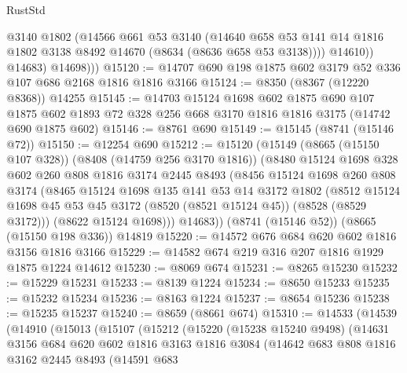 \begin{lexlean}{RustStd}
\begin{coremodule}
                @3140
                @1802
                (@14566
                  @661
                  @53
                  @3140
                  (@14640
                    @658
                    @53
                    @141
                    @14
                    @1816
                    @1802
                    @3138
                    @8492
                    @14670
                    (@8634 (@8636 @658 @53 @3138))))
                @14610))
            @14683)
          @14698)))
@15120 := @14707 @690 @198 @1875 @602 @3179 @52 @336 @107 @686 @2168 @1816 @1816 @3166
@15124 := @8350 (@8367 (@12220 @8368)) @14255
@15145 := @14703
    @15124
    @1698
    @602
    @1875
    @690
    @107
    @1875
    @602
    @1893
    @72
    @328
    @256
    @668
    @3170
    @1816
    @1816
    @3175
    (@14742 @690 @1875 @602)
@15146 := @8761 @690
@15149 := @15145 (@8741 (@15146 @72))
@15150 := @12254 @690
@15212 := @15120
    (@15149
      (@8665 (@15150 @107 @328))
      (@8408 (@14759 @256 @3170 @1816))
      (@8480
        @15124
        @1698
        @328
        @602
        @260
        @808
        @1816
        @3174
        @2445
        @8493
        (@8456
          @15124
          @1698
          @260
          @808
          @3174
          (@8465
            @15124
            @1698
            @135
            @141
            @53
            @14
            @3172
            @1802
            (@8512 @15124 @1698 @45 @53 @45 @3172 (@8520 (@8521 @15124 @45)) (@8528 (@8529 @3172)))
            (@8622 @15124 @1698)))
        @14683))
    (@8741 (@15146 @52))
    (@8665 (@15150 @198 @336))
    @14819
@15220 := @14572 @676 @684 @620 @602 @1816 @3156 @1816 @3166
@15229 := @14582 @674 @219 @316 @207 @1816 @1929 @1875 @1224 @14612
@15230 := @8069 @674
@15231 := @8265 @15230
@15232 := @15229 @15231
@15233 := @8139 @1224
@15234 := @8650 @15233
@15235 := @15232 @15234
@15236 := @8163 @1224
@15237 := @8654 @15236
@15238 := @15235 @15237
@15240 := @8659 (@8661 @674)
@15310 := @14533
    (@14539
      (@14910
        (@15013
          (@15107
            (@15212
              (@15220
                (@15238 @15240 @9498)
                (@14631
                  @3156
                  @684
                  @620
                  @602
                  @1816
                  @3163
                  @1816
                  @3084
                  (@14642
                    @683
                    @808
                    @1816
                    @3162
                    @2445
                    @8493
                    (@14591
                      @683

\end{coremodule}
\end{lexlean}
